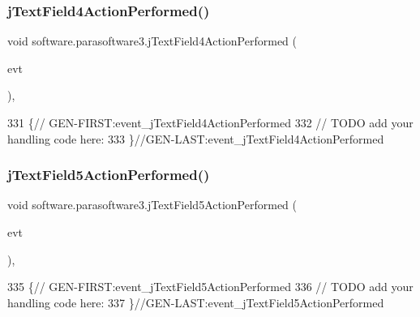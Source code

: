 \subsubsection{\texorpdfstring{j\+Text\+Field4\+Action\+Performed()}{jTextField4ActionPerformed()}}
{\footnotesize\ttfamily void software.\+parasoftware3.\+j\+Text\+Field4\+Action\+Performed (\begin{DoxyParamCaption}\item[{java.\+awt.\+event.\+Action\+Event}]{evt }\end{DoxyParamCaption})\hspace{0.3cm}{\ttfamily [inline]}, {\ttfamily [private]}}


\begin{DoxyCode}
331                                                                             \{\textcolor{comment}{//
      GEN-FIRST:event\_jTextField4ActionPerformed}
332         \textcolor{comment}{// TODO add your handling code here:}
333     \}\textcolor{comment}{//GEN-LAST:event\_jTextField4ActionPerformed}
\end{DoxyCode}
\mbox{\label{classsoftware_1_1parasoftware3_a097c2aa02dfa066c6041878ef8ba4e8c}} 
\subsubsection{\texorpdfstring{j\+Text\+Field5\+Action\+Performed()}{jTextField5ActionPerformed()}}
{\footnotesize\ttfamily void software.\+parasoftware3.\+j\+Text\+Field5\+Action\+Performed (\begin{DoxyParamCaption}\item[{java.\+awt.\+event.\+Action\+Event}]{evt }\end{DoxyParamCaption})\hspace{0.3cm}{\ttfamily [inline]}, {\ttfamily [private]}}


\begin{DoxyCode}
335                                                                             \{\textcolor{comment}{//
      GEN-FIRST:event\_jTextField5ActionPerformed}
336         \textcolor{comment}{// TODO add your handling code here:}
337     \}\textcolor{comment}{//GEN-LAST:event\_jTextField5ActionPerformed}
\end{DoxyCode}
\mbox{\label{classsoftware_1_1parasoftware3_a146926b0a1a316565b96a3e6d35ad5f9}} 
